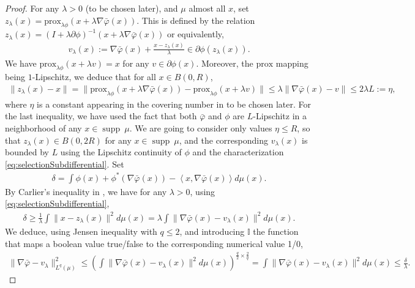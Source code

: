 \documentclass[11pt]{article}
\DeclareMathOperator{\supp}{supp}
\newcommand{\1}{\mathbbm{1}}
\newcommand{\prox}{\mathrm{prox}}
\numberwithin{equation}{section}
\begin{document}
\begin{proof}
	For any $\lambda > 0$ (to be chosen later), and $\mu$ almost all $x$, set $z_\lambda(x) = \prox_{\lambda \phi}(x + \lambda \nabla \bar{\varphi}(x))$. This is defined by the relation $z_\lambda(x) = (I + \lambda \partial \phi)^{-1}(x + \lambda \nabla \bar \varphi(x))$ or equivalently,
	\begin{align}
		\label{eq:selectionSubdifferential}
		v_\lambda (x):= \nabla \bar{\varphi}(x) + \frac{x- z_\lambda(x)}{\lambda} \in \partial \phi (z_\lambda(x)).
	\end{align}
    We have $\prox_{\lambda \phi}(x + \lambda v) = x$ for any $v \in \partial \phi(x)$. Moreover, the $\prox$ mapping being $1$-Lipschitz, we deduce that for all $x \in B(0,R)$,
	\begin{align}
        \label{eq:definitionEta}
		\|z_\lambda(x) - x \| = \|\prox_{\lambda \phi}(x + \lambda \nabla \bar{\varphi}(x)) - \prox_{\lambda \phi}(x + \lambda v)\|  \leq \lambda \| \nabla \bar\varphi(x) -v \|\leq 2 \lambda L := \eta,
	\end{align}
	where $\eta$ is a constant appearing in the covering number in  to be chosen later. For the last inequality, we have used the fact that both $\bar{\varphi}$ and $\phi$ are $L$-Lipschitz in a neighborhood of any $x \in \supp\ \mu$. We are going to consider only values $\eta \leq R$, so that $z_\lambda(x) \in B(0,2R)$ for any $x \in \supp\ \mu$, and the corresponding $v_\lambda(x)$ is bounded by $L$ using the Lipschitz continuity of $\phi$ and the characterization \eqref{eq:selectionSubdifferential}.
	Set
	\begin{align*}
		\delta = \int \phi(x) + \phi^*(\nabla \bar{\varphi}(x)) - \left\langle x, \nabla \bar{\varphi}(x) \right\rangle  d\mu(x).
	\end{align*}
	By Carlier's inequality in , we have for any $\lambda > 0$, using \eqref{eq:selectionSubdifferential},
	\begin{align*}
		\delta \geq \frac{1}{\lambda} \int\|x - z_\lambda(x)\|^2 d\mu(x) = \lambda \int\|\nabla \bar{\varphi}(x) - v_\lambda(x)\|^2 d\mu(x).
	\end{align*}
	We deduce, using Jensen inequality with $q \leq 2$, and introducing $\mathbb{I}$ the function that maps a boolean value true/false to the corresponding numerical value 1/0,
	\begin{align}
		\label{eq:ineqTemp1}
		\|\nabla \bar{\varphi} - v_\lambda\|_{L^q(\mu)}^2  \leq \left(\int\|\nabla \bar{\varphi}(x) - v_\lambda(x)\|^2 d\mu(x)\right)^{\frac{q}{2} \times \frac{2}{q}} = \int\|\nabla \bar{\varphi}(x) -  v_\lambda(x)\|^2 d\mu(x) \leq \frac{\delta}{\lambda}.

\end{align}
\end{proof}
\end{document}
